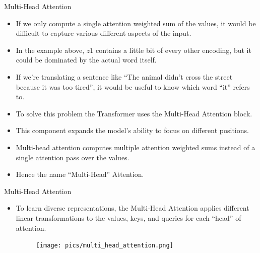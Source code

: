 \documentclass[handout]{beamer}
\begin{document}
\begin{frame}{Multi-Head Attention}
\begin{scriptsize}
\begin{itemize}

 \item If we only compute a single attention weighted sum of the values, it would be difficult to capture various different aspects of the input.
 

\item In the example above, $z1$ contains a little bit of every other encoding, but it could be dominated by the actual word itself.

\item If we’re translating a sentence like ``The animal didn’t cross the street because it was too tired'', it would be useful to know which word ``it'' refers to.
 
 \item To solve this problem the Transformer uses the Multi-Head Attention block. 


\item This component expands the model's ability to focus on different positions. 
 
 
 \item Multi-head attention computes multiple attention weighted sums instead of a single attention pass over the values.
 
 \item Hence the name ``Multi-Head'' Attention.
 
 
 
\end{itemize}

\end{scriptsize}

\end{frame}



\begin{frame}{Multi-Head Attention}
\begin{scriptsize}
\begin{itemize}
 \item To learn diverse representations, the Multi-Head Attention applies different linear transformations to the values, keys, and queries for each “head” of attention.
 
 
     \begin{figure}[h]
        	\texttt{[image: pics/multi\_head\_attention.png]}
        \end{figure}  
 

\end{itemize}

\end{scriptsize}

\end{frame}
\end{document}
